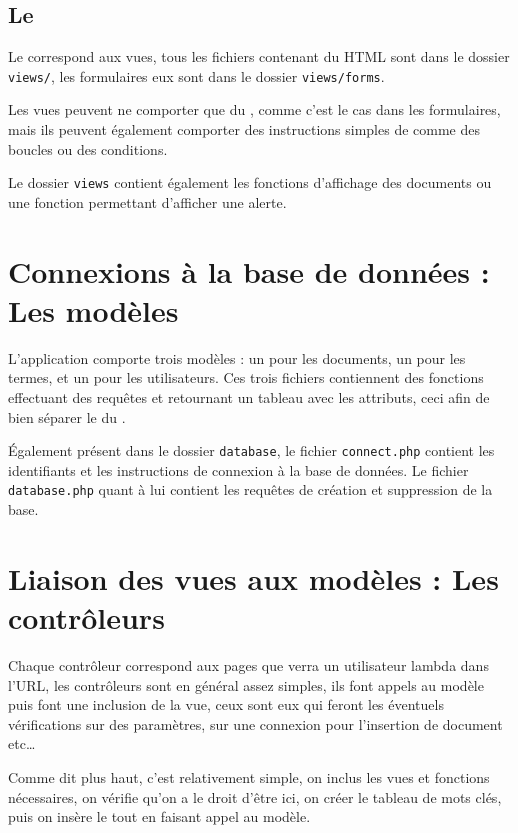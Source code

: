 \documentclass[12pt,a4paper,openany]{book}
\begin{document}
		\subsection{Le }
		Le  correspond aux vues, tous les fichiers contenant du HTML sont dans le dossier \texttt{views/}, les formulaires 
		eux sont dans le dossier \texttt{views/forms}.
		
		Les vues peuvent ne comporter que du , comme c'est le cas dans les formulaires, mais ils peuvent également comporter des instructions simples
		de  comme des boucles ou des conditions.

		Le dossier \texttt{views} contient également les fonctions d'affichage des documents ou une fonction permettant d'afficher une alerte. 
			
		\section{Connexions à la base de données : Les modèles}
		L'application comporte trois modèles : un pour les documents, un pour les termes, et un pour les utilisateurs. Ces trois fichiers contiennent des fonctions effectuant des
		requêtes et retournant un tableau avec les attributs, ceci afin de bien séparer le  du .

		Également présent dans le dossier \texttt{database}, le fichier \texttt{connect.php} contient les identifiants et les
		instructions de connexion à la base de données. Le fichier \texttt{database.php} quant à lui contient les requêtes de
		création et suppression de la base.

		
		
		\section{Liaison des vues aux modèles : Les contrôleurs}
		Chaque contrôleur correspond aux pages que verra un utilisateur lambda dans l'URL, les contrôleurs sont en général assez
		simples, ils font appels au modèle puis font une inclusion de la vue, ceux sont eux qui feront les éventuels vérifications
		sur des paramètres, sur une connexion pour l'insertion de document etc\ldots
		
		Comme dit plus haut, c'est relativement simple, on inclus les vues et fonctions nécessaires, on vérifie qu'on a le droit
		d'être ici, on créer le tableau de mots clés, puis on insère le tout en faisant appel au modèle.
\end{document}
